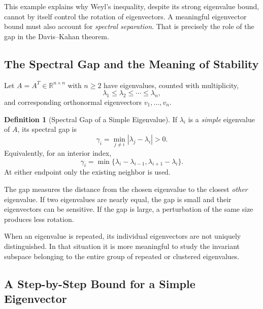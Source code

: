 \documentclass[14pt,letterpaper]{article}
\theoremstyle{plain}
\theoremstyle{definition}
\newtheorem{definition}[theorem]{Definition}
\theoremstyle{remark}
\newcommand{\R}{\mathbb{R}}
\begin{document}
This example explains why Weyl's inequality, despite
its strong eigenvalue bound, cannot by itself control
the rotation of eigenvectors. A meaningful eigenvector
bound must also account for \emph{spectral separation}.
That is precisely the role of the gap in the
Davis--Kahan theorem.


\subsection{The Spectral Gap and the Meaning of Stability}
\label{subsec:dk_gap}

Let $A=A^T\in\R^{n\times n}$ with $n\geq2$ have eigenvalues, counted with multiplicity,
\[
\lambda_1\leq\lambda_2\leq\cdots\leq\lambda_n,
\]
and corresponding orthonormal eigenvectors
$v_1,\ldots,v_n$.

\begin{definition}[Spectral Gap of a Simple Eigenvalue]
\label{def:dk_gap}
If $\lambda_i$ is a \emph{simple} eigenvalue of $A$,
its spectral gap is
\[
\boxed{
\gamma_i=\min_{j\neq i}|\lambda_j-\lambda_i|>0.
}
\]
Equivalently, for an interior index,
\[
\gamma_i=\min\{\lambda_i-\lambda_{i-1},
                    \lambda_{i+1}-\lambda_i\}.
\]
At either endpoint only the existing neighbor is used.
\end{definition}

The gap measures the distance from the chosen eigenvalue
to the closest \emph{other} eigenvalue. If two eigenvalues
are nearly equal, the gap is small and their eigenvectors
can be sensitive. If the gap is large, a perturbation of
the same size produces less rotation.

When an eigenvalue is repeated, its individual eigenvectors
are not uniquely distinguished. In that situation it is
more meaningful to study the invariant subspace belonging
to the entire group of repeated or clustered eigenvalues.


\subsection{A Step-by-Step Bound for a Simple Eigenvector}
\label{subsec:dk_simple}
\end{document}
